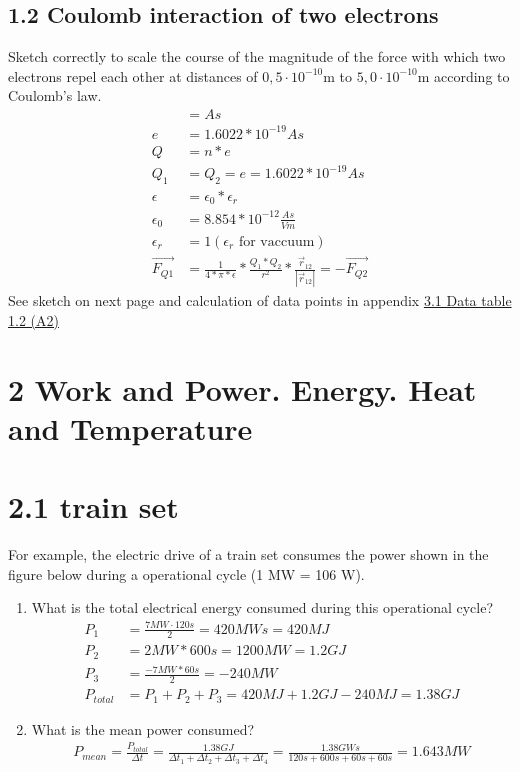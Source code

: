 \documentclass[10pt,ngerman]{scrartcl}
\begin{document}
\subsection{1.2 Coulomb interaction of two electrons}
Sketch correctly to scale the course of the magnitude of the force with which two electrons repel each other at distances of $0,5 \cdot 10^{-10}$m to $5,0 \cdot 10^{-10}$m according to Coulomb's law.
\begin{align*}
	[Q] &= As \\
	e &= 1.6022 * 10^{-19} As \\
	Q &= n * e \\
	Q_{1} &= Q_{2} = e = 1.6022 * 10^{-19} As \\
	\epsilon &= \epsilon_{0} * \epsilon_{r} \\
	\epsilon_{0} &= 8.854 * 10^{-12} \frac{As}{Vm} \\
	\epsilon_{r} &= 1 (\epsilon_{r} \text{ for vaccuum})\\
	\vec{F_{Q1}} &= \frac{1}{4 * \pi * \epsilon } * \frac{Q_{1}*Q_{2}}{r^{2}} * \frac{\vec{r}_{12}}{|\vec{r}_{12}|} = -\vec{F_{Q2}}
\end{align*}
See sketch on next page and calculation of data points in appendix \hyperref[sec:data-table-a2]{3.1 Data table 1.2 (A2)}

\begin{landscape}
 
\end{landscape}

\newpage
\section{2 Work and Power. Energy. Heat and Temperature}
\section{2.1 train set}
For example, the electric drive of a train set consumes the power shown in the figure below during a operational cycle (1 MW = 106 W).

\begin{enumerate}
	\item What is the total electrical energy consumed during this operational cycle?
	\begin{align}
		P_{1} &= \frac{7MW\cdot 120s}{2} = 420MWs = 420MJ\\
		P_{2} &= 2 MW * 600s = 1200 MW = 1.2 GJ\\
		P_{3} &= \frac{-7MW * 60s}{2} = -240 MW\\
		P_{total} &= P_{1} + P_{2} + P_{3} = 420MJ + 1.2 GJ - 240 MJ = 1.38 GJ
	\end{align}
	\item What is the mean power consumed?
	\begin{align}
        P_{mean} = \frac{P_{total}}{\Delta t} = \frac{1.38 GJ}{\Delta t_{1} +\Delta t_{2} +\Delta t_{3} +\Delta t_{4}}
		= \frac{1.38GWs}{120s + 600s + 60s + 60s} = 1.643MW
    \end{align}
\end{enumerate}
\end{document}

